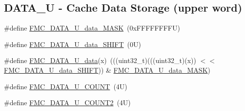 \subsection*{D\+A\+T\+A\+\_\+U -\/ Cache Data Storage (upper word)}
\begin{DoxyCompactItemize}
\item 
\#define \mbox{\hyperlink{group___f_m_c___register___masks_gae43292c4f0149b2bc25d115b7f5a6ee9}{F\+M\+C\+\_\+\+D\+A\+T\+A\+\_\+\+U\+\_\+data\+\_\+\+M\+A\+SK}}~(0x\+F\+F\+F\+F\+F\+F\+F\+F\+U)
\item 
\#define \mbox{\hyperlink{group___f_m_c___register___masks_gaa7a3b8bfa7aac03f2eef0b5e58dfbb44}{F\+M\+C\+\_\+\+D\+A\+T\+A\+\_\+\+U\+\_\+data\+\_\+\+S\+H\+I\+FT}}~(0\+U)
\item 
\#define \mbox{\hyperlink{group___f_m_c___register___masks_ga1d2a8d98c4d178ac289f37108e881404}{F\+M\+C\+\_\+\+D\+A\+T\+A\+\_\+\+U\+\_\+data}}(x)~(((uint32\+\_\+t)(((uint32\+\_\+t)(x)) $<$$<$ \mbox{\hyperlink{group___f_m_c___register___masks_gaa7a3b8bfa7aac03f2eef0b5e58dfbb44}{F\+M\+C\+\_\+\+D\+A\+T\+A\+\_\+\+U\+\_\+data\+\_\+\+S\+H\+I\+FT}})) \& \mbox{\hyperlink{group___f_m_c___register___masks_gae43292c4f0149b2bc25d115b7f5a6ee9}{F\+M\+C\+\_\+\+D\+A\+T\+A\+\_\+\+U\+\_\+data\+\_\+\+M\+A\+SK}})
\item 
\#define \mbox{\hyperlink{group___f_m_c___register___masks_ga08fdec7c51af06e1b8e77c08d4152ca0}{F\+M\+C\+\_\+\+D\+A\+T\+A\+\_\+\+U\+\_\+\+C\+O\+U\+NT}}~(4\+U)
\item 
\#define \mbox{\hyperlink{group___f_m_c___register___masks_ga1da1b5e0fd42e2cb22a7b686f59308ac}{F\+M\+C\+\_\+\+D\+A\+T\+A\+\_\+\+U\+\_\+\+C\+O\+U\+N\+T2}}~(4\+U)
\end{DoxyCompactItemize}
